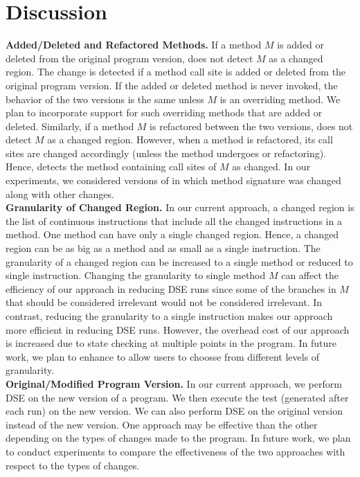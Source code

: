 
\section{Discussion}

\label{sec:discussion}

\textbf{Added/Deleted and Refactored Methods.} If a method $M$ is added or deleted from the original program version,  does not detect $M$ as a changed region. The change is detected if a method call site is added or deleted from the original program version. If the added or deleted method is never invoked, the behavior of the two versions is the same unless $M$ is an overriding method. We plan to incorporate support for such overriding methods that are added or deleted. Similarly, if a method $M$ is refactored between the two versions,  does not detect $M$ as a changed region. However, when a method is refactored, its call sites are changed accordingly (unless the method undergoes  or  refactoring). Hence,  detects the method containing call sites of $M$ as changed. In our experiments, we considered versions of  in which method signature was changed along with other changes.
\\ \textbf{Granularity of Changed Region.} In our current approach, a changed region is the list of continuous instructions that include all the changed instructions in a method. One method can have only a single changed region. Hence, a changed region can be as big as a method and as small as a single instruction. The granularity of a changed region can be increased to a single method or reduced to single instruction. Changing the granularity to single method $M$ can affect the efficiency of our approach in reducing DSE runs since some of the branches in $M$ that should be considered irrelevant would not be considered irrelevant. In contrast, reducing the granularity to a single instruction makes our approach more efficient in reducing DSE runs. However, the overhead cost of our approach is increased due to state checking at multiple points in the program. In future work, we plan to enhance  to allow users to choosse from different levels of granularity. 
\\ \textbf{Original/Modified Program Version.} In our current approach, we perform DSE on the new version of a program. We then execute the test (generated after each run) on the new version. We can also perform DSE on the original version instead of the new version. One approach may be effective than the other depending on the types of changes made to the program. In future work, we plan to conduct experiments to compare the effectiveness of the two approaches with respect to the types of changes. 
